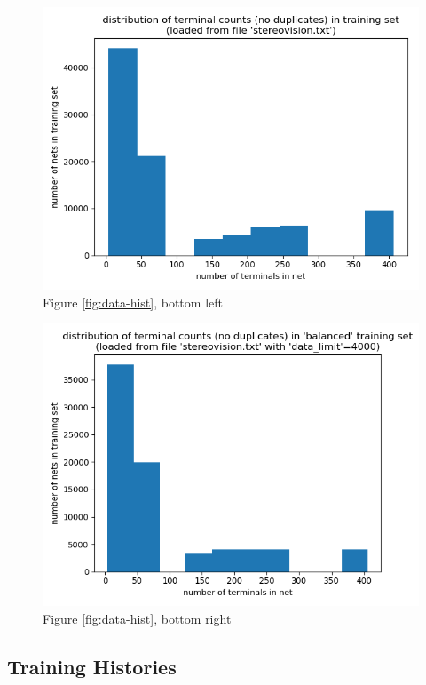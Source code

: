 \begin{figure}[H]
	\includegraphics[width=\linewidth]{plots/data-distribution-full-coarse.png}
	\caption{Figure \ref{fig:data-hist}, bottom left}
\end{figure}

\begin{figure}[H]
	\includegraphics[width=\linewidth]{plots/data-distribution-limited-coarse.png}
	\caption{Figure \ref{fig:data-hist}, bottom right}
\end{figure}

\subsection{Training Histories}

